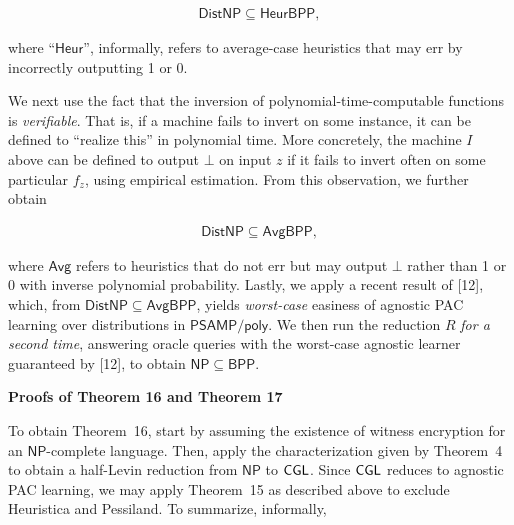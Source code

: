 \documentclass[10pt,a4paper]{article}
\begin{document}
\[\begin{gathered}
{\mathsf{Dist}}{\mathsf{NP}}\subseteq{\mathsf{Heur}}{\mathsf{BPP}},
\end{gathered}\]


where “${\mathsf{Heur}}$”, informally, refers to average-case heuristics that may err by incorrectly outputting 1 or 0.\par




We next use the fact that the inversion of polynomial-time-computable functions is \emph{verifiable}. That is, if a machine fails to invert on some instance, it can be defined to “realize this” in polynomial time. More concretely, the machine $I$ above can be defined to output $\bot$ on input $z$ if it fails to invert often on some particular $f_{z}$, using empirical estimation. From this observation, we further obtain\par


\[\begin{gathered}
{\mathsf{Dist}}{\mathsf{NP}}\subseteq{\mathsf{Avg}}{\mathsf{BPP}},
\end{gathered}\]


where ${\mathsf{Avg}}$ refers to heuristics that do not err but may output $\bot$ rather than 1 or 0 with inverse polynomial probability. Lastly, we apply a recent result of [12], which, from ${\mathsf{Dist}}{\mathsf{NP}}\subseteq{\mathsf{Avg}}{\mathsf{BPP}}$, yields \emph{worst-case} easiness of agnostic PAC learning over distributions in ${\mathsf{P}}{\mathsf{SAMP}}/{\mathsf{poly}}$. We then run the reduction $R$ \emph{for a second time}, answering oracle queries with the worst-case agnostic learner guaranteed by [12], to obtain ${\mathsf{NP}}\subseteq{\mathsf{BPP}}$.\par





\par\medskip\noindent\textbf{Proofs of Theorem 16 and Theorem 17
}\par




To obtain Theorem 16, start by assuming the existence of witness encryption for an ${\mathsf{NP}}$-complete language. Then, apply the characterization given by Theorem 4 to obtain a half-Levin reduction from ${\mathsf{NP}}$ to ${\sf CGL}$. Since ${\sf CGL}$ reduces to agnostic PAC learning, we may apply Theorem 15 as described above to exclude Heuristica and Pessiland. To summarize, informally,\par
\end{document}
